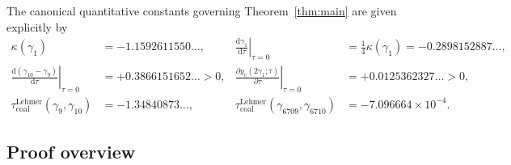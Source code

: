 \documentclass[11pt,reqno]{amsart}
\theoremstyle{definition}
\theoremstyle{remark}
\numberwithin{equation}{section}
\newcommand{\dd}{\mathrm{d}}
\begin{document}
The canonical quantitative constants governing Theorem~\ref{thm:main} are given explicitly by
\begin{equation}\label{eq:canonical_constants}
\begin{aligned}
\kappa(\gamma_1) &= -1.1592611550\dots, & \left.\frac{\dd\gamma_1}{\dd\tau}\right|_{\tau=0} &= \frac{1}{4}\kappa(\gamma_1) = -0.2898152887\dots, \\
\left.\frac{\dd(\gamma_{10}-\gamma_9)}{\dd\tau}\right|_{\tau=0} &= +0.3866151652\dots > 0, & \left.\frac{\partial y_c(2\gamma_1;\tau)}{\partial\tau}\right|_{\tau=0} &= +0.0125362327\dots > 0, \\
\tau_{\mathrm{coal}}^{\mathrm{Lehmer}}(\gamma_9,\gamma_{10}) &= -1.34840873\dots, & \tau_{\mathrm{coal}}^{\mathrm{Lehmer}}(\gamma_{6709},\gamma_{6710}) &= -7.096664 \times 10^{-4}.
\end{aligned}
\end{equation}

\subsection{Proof overview}\label{subsec:proof_overview}
\end{document}
